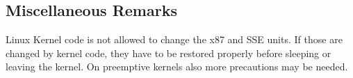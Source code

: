 \subsection{Miscellaneous Remarks}

Linux Kernel code is not allowed to change the x87 and SSE units.  If
those are changed by kernel code, they have to be restored properly
before sleeping or leaving the kernel.  On preemptive kernels also
more precautions may be needed.


